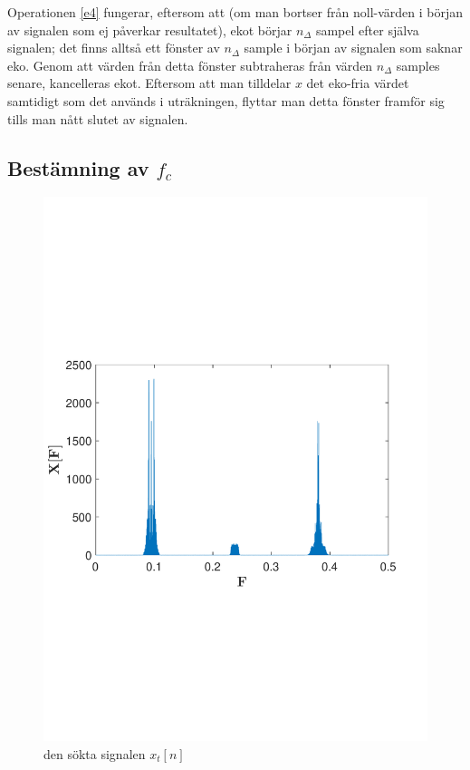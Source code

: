 \documentclass[10pt,twocolumn]{article}
\begin{document}
Operationen \ref{e4} fungerar, eftersom att (om man bortser från noll-värden i början av signalen som ej påverkar resultatet), ekot börjar $n_\Delta$
sampel efter själva signalen; det finns alltså ett fönster av $n_\Delta$ sample i början av signalen som saknar eko. Genom att
värden från detta fönster subtraheras från värden $n_\Delta$ samples senare, kancelleras ekot. Eftersom att man tilldelar $x$ det eko-fria
värdet samtidigt som det används i uträkningen, flyttar man detta fönster framför sig tills man nått slutet av signalen.

\subsection{Bestämning av $f_c$}

\begin{figure}[h]
    \includegraphics[width=\linewidth]{fig2}
    \caption{
        den sökta signalen $x_t[n]$ 
        \label{fig:xt}
    }
\end{figure}
\end{document}
